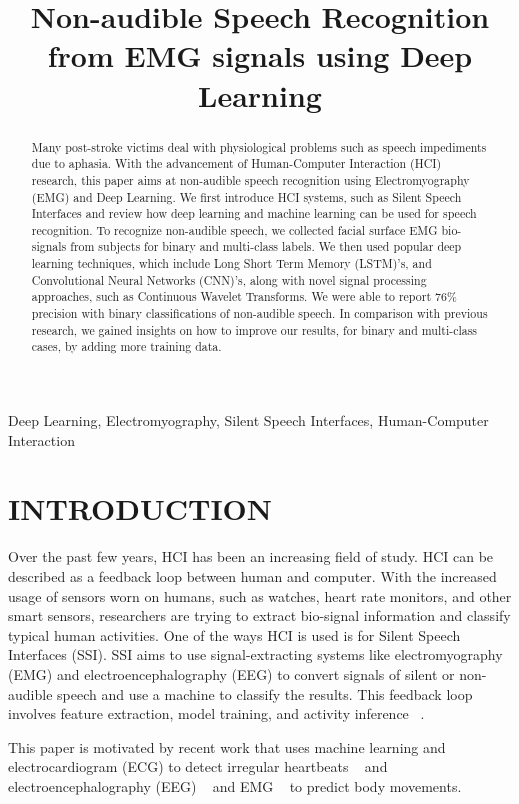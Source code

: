 \documentclass{article}
\title{Non-audible Speech Recognition from EMG signals using Deep Learning}
\begin{document}
%
\maketitle
%
\begin{abstract}
Many post-stroke victims deal with physiological problems such as speech impediments due to aphasia. With the advancement of Human-Computer Interaction (HCI) research, this paper aims at non-audible speech recognition using Electromyography (EMG) and Deep Learning. We first introduce HCI systems, such as Silent Speech Interfaces and review how deep learning and machine learning can be used for speech recognition. To recognize non-audible speech, we collected facial surface EMG bio-signals from subjects for binary and multi-class labels. We then used popular deep learning techniques, which include Long Short Term Memory (LSTM)'s, and Convolutional Neural Networks (CNN)'s, along with novel signal processing approaches, such as Continuous Wavelet Transforms. We were able to report 76\% precision with binary classifications of non-audible speech. In comparison with previous research,  we gained insights on how to improve our results, for binary and multi-class cases, by adding more training data.
\end{abstract}
%
\begin{keywords}
Deep Learning, Electromyography, Silent Speech Interfaces, Human-Computer Interaction
\end{keywords}
%
\section{INTRODUCTION}
\label{sec:INTRODUCTION}

Over the past few years, HCI has been an increasing field of study. HCI can be described as a feedback loop between human and computer. With the increased usage of sensors worn on humans, such as watches, heart rate monitors, and other smart sensors, researchers are trying to extract bio-signal information and classify typical human activities. One of the ways HCI is used is for Silent Speech Interfaces (SSI). SSI aims to use signal-extracting systems like electromyography (EMG) and electroencephalography (EEG) to convert signals of silent or non-audible speech and use a machine to classify the results. This feedback loop involves feature extraction, model training, and activity inference ~\cite{wang_deep_2017}.

This paper is motivated by recent work that uses machine learning and  electrocardiogram (ECG) to detect irregular heartbeats ~\cite{noauthor_classify_nodate} and electroencephalography (EEG) ~\cite{eltvik_deep_nodate} and EMG  ~\cite{altamirano_emg_nodate} to predict body movements. 
\end{document}
